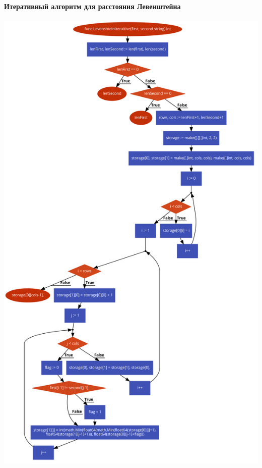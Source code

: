 \documentclass[utf8x, 12pt]{G7-32} %
\begin{document}
\paragraph{Итеративный алгоритм для расстояния Левенштейна}
\begin{center}
	\includegraphics[scale=0.32]{images/levenshteinIterative.png}
\end{center}

\newpage
\end{document}
